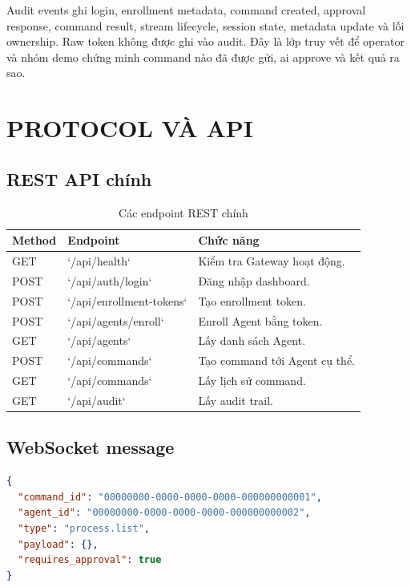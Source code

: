 \documentclass[12pt,a4paper]{article}
\begin{document}
Audit events ghi login, enrollment metadata, command created, approval response, command result, stream lifecycle, session state, metadata update và lỗi ownership. Raw token không được ghi vào audit. Đây là lớp truy vết để operator và nhóm demo chứng minh command nào đã được gửi, ai approve và kết quả ra sao.

\section{PROTOCOL VÀ API}

\subsection{REST API chính}

\begin{table}[H]
\centering
\caption{Các endpoint REST chính}
\begin{tabularx}{\textwidth}{|p{}|p{}|Y|}
\hline
\textbf{Method} & \textbf{Endpoint} & \textbf{Chức năng}\\
\hline
GET & `/api/health` & Kiểm tra Gateway hoạt động.\\
\hline
POST & `/api/auth/login` & Đăng nhập dashboard.\\
\hline
POST & `/api/enrollment-tokens` & Tạo enrollment token.\\
\hline
POST & `/api/agents/enroll` & Enroll Agent bằng token.\\
\hline
GET & `/api/agents` & Lấy danh sách Agent.\\
\hline
POST & `/api/commands` & Tạo command tới Agent cụ thể.\\
\hline
GET & `/api/commands` & Lấy lịch sử command.\\
\hline
GET & `/api/audit` & Lấy audit trail.\\
\hline
\end{tabularx}
\end{table}

\subsection{WebSocket message}

\begin{lstlisting}[language=json,caption={Command request với dữ liệu giả}]
{
  "command_id": "00000000-0000-0000-0000-000000000001",
  "agent_id": "00000000-0000-0000-0000-000000000002",
  "type": "process.list",
  "payload": {},
  "requires_approval": true
}
\end{lstlisting}
\end{document}
